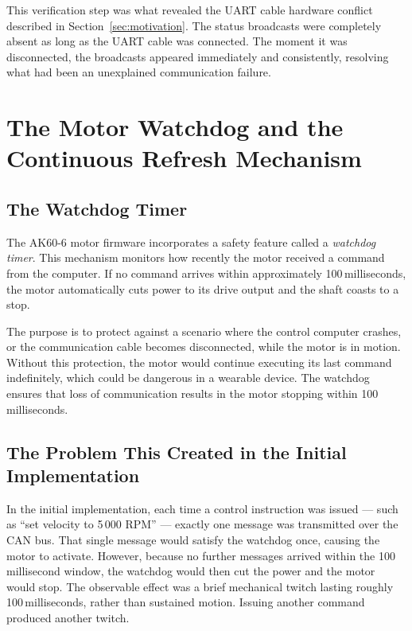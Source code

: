 \documentclass[12pt,a4paper]{article}
\begin{document}
This verification step was what revealed the UART cable hardware conflict
described in Section~\ref{sec:motivation}. The status broadcasts were
completely absent as long as the UART cable was connected. The moment it
was disconnected, the broadcasts appeared immediately and consistently,
resolving what had been an unexplained communication failure.

\section{The Motor Watchdog and the Continuous Refresh Mechanism}
\label{sec:watchdog}

\subsection{The Watchdog Timer}

The AK60-6 motor firmware incorporates a safety feature called a
\emph{watchdog timer}. This mechanism monitors how recently the motor
received a command from the computer. If no command arrives within
approximately 100\,milliseconds, the motor automatically cuts power to
its drive output and the shaft coasts to a stop.

The purpose is to protect against a scenario where the control computer
crashes, or the communication cable becomes disconnected, while the motor
is in motion. Without this protection, the motor would continue executing
its last command indefinitely, which could be dangerous in a wearable
device. The watchdog ensures that loss of communication results in the
motor stopping within 100\,milliseconds.

\subsection{The Problem This Created in the Initial Implementation}

In the initial implementation, each time a control instruction was issued
--- such as ``set velocity to 5\,000 RPM'' --- exactly one message was
transmitted over the CAN bus. That single message would satisfy the
watchdog once, causing the motor to activate. However, because no further
messages arrived within the 100\,millisecond window, the watchdog would
then cut the power and the motor would stop. The observable effect was a
brief mechanical twitch lasting roughly 100\,milliseconds, rather than
sustained motion. Issuing another command produced another twitch.
\end{document}
